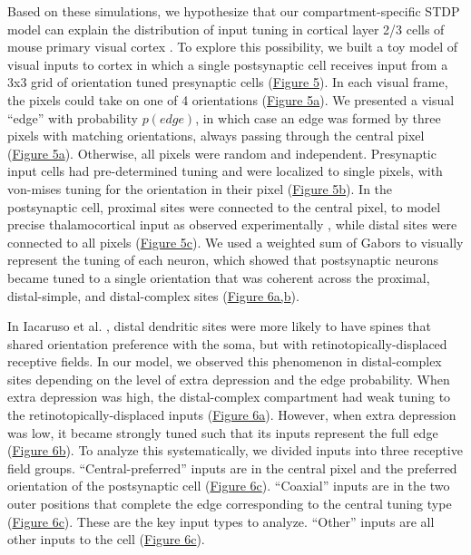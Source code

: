 \documentclass[twocolumn]{theme/bioRxiv}
\begin{document}
Based on these simulations, we hypothesize that our compartment-specific STDP model can explain the distribution of input tuning in cortical layer 2/3 cells of mouse primary visual cortex \citep{iacarusoSynapticOrganizationVisual2017}. To explore this possibility, we built a toy model of visual inputs to cortex in which a single postsynaptic cell receives input from a 3x3 grid of orientation tuned presynaptic cells (\hyperref[fig:5]{Figure 5}). In each visual frame, the pixels could take on one of 4 orientations (\hyperref[fig:5]{Figure 5a}). We presented a visual “edge” with probability $p(edge)$, in which case an edge was formed by three pixels with matching orientations, always passing through the central pixel (\hyperref[fig:5]{Figure 5a}). Otherwise, all pixels were random and independent. Presynaptic input cells had pre-determined tuning and were localized to single pixels, with von-mises tuning for the orientation in their pixel (\hyperref[fig:5]{Figure 5b}). In the postsynaptic cell, proximal sites were connected to the central pixel, to model precise thalamocortical input as observed experimentally \citep{zhuangLaminarDistributionArbor2021}, while distal sites were connected to all pixels (\hyperref[fig:5]{Figure 5c}). We used a weighted sum of Gabors to visually represent the tuning of each neuron, which showed that postsynaptic neurons became tuned to a single orientation that was coherent across the proximal, distal-simple, and distal-complex sites (\hyperref[fig:6]{Figure 6a,b}). 

In Iacaruso et al. \citep{iacarusoSynapticOrganizationVisual2017}, distal dendritic sites were more likely to have spines that shared orientation preference with the soma, but with retinotopically-displaced receptive fields. In our model, we observed this phenomenon in distal-complex sites depending on the level of extra depression and the edge probability. When extra depression was high, the distal-complex compartment had weak tuning to the retinotopically-displaced inputs (\hyperref[fig:6]{Figure 6a}). However, when extra depression was low, it became strongly tuned such that its inputs represent the full edge (\hyperref[fig:6]{Figure 6b}). To analyze this systematically, we divided inputs into three receptive field groups. “Central-preferred” inputs are in the central pixel and the preferred orientation of the postsynaptic cell (\hyperref[fig:6]{Figure 6c}). “Coaxial” inputs are in the two outer positions that complete the edge corresponding to the central tuning type (\hyperref[fig:6]{Figure 6c}). These are the key input types to analyze. “Other” inputs are all other inputs to the cell (\hyperref[fig:6]{Figure 6c}). 
\end{document}
